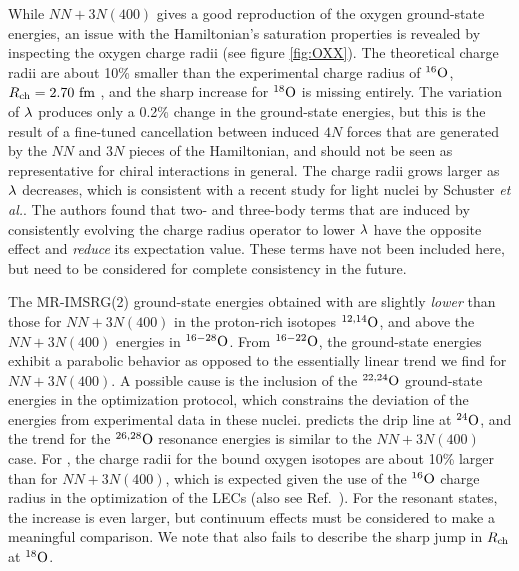 {While $NN+3N(400)$ gives a good reproduction of the oxygen ground-state
energies, an issue with the Hamiltonian's saturation properties is revealed
by inspecting the oxygen charge radii (see figure \ref{fig:OXX}). 
The theoretical charge radii are about 10\% smaller
than the experimental charge radius of $\nuc{O}{16}$, $\Rch=2.70\,\fm$ 
\cite{Angeli:2013rz}, and the sharp increase for $\nuc{O}{18}$ is missing 
entirely. The variation of $\lambdaSRG$ produces only a 0.2\%
change in the ground-state energies, but this is the result of
a fine-tuned cancellation between induced $4N$ forces that are
generated by the $NN$ and $3N$ pieces of the Hamiltonian, and
should not be seen as representative for chiral interactions in
general. The charge radii grows larger as $\lambdaSRG$ decreases,
which is consistent with a recent study for light nuclei 
by Schuster \emph{et al.}\cite{Schuster:2014oq}. The authors found 
that two- and three-body terms that are induced by consistently evolving
the charge radius operator to lower $\lambdaSRG$ have the opposite
effect and \emph{reduce} its expectation value. These terms have not 
been included here, but need to be considered for complete consistency
in the future.

The MR-IMSRG(2) ground-state energies obtained with \NNLOsat{} are 
slightly \emph{lower} than those for $NN\!+\!3N(400)$ in the proton-rich
isotopes $\nuc{O}{12,14}$, and above the $NN\!+\!3N(400)$ energies in 
$\nuc{O}{16-28}$. From $\nuc{O}{16-22}$, the \NNLOsat{} ground-state energies
exhibit a parabolic behavior as opposed to the essentially linear trend
we find for $NN\!+\!3N(400)$. A possible cause is the inclusion of the $\nuc{O}{22,24}$
ground-state energies in the optimization protocol, which constrains
the deviation of the energies from experimental data in these nuclei. 
\NNLOsat{} predicts the drip line at $\nuc{O}{24}$, and the trend for 
the $\nuc{O}{26,28}$ resonance energies is similar to the $NN\!+\!3N(400)$ 
case. For \NNLOsat{}, the charge radii for the bound oxygen isotopes are 
about 10\% larger than for $NN\!+\!3N(400)$, which is expected given 
the use of the $\nuc{O}{16}$ charge radius in the optimization of 
the LECs (also see Ref.~\cite{Lapoux:2016xu}). For the resonant states, 
the increase is even larger, but continuum effects must be considered to 
make a meaningful comparison. We note that \NNLOsat{} also fails to describe 
the sharp jump in $\Rch$ at $\nuc{O}{18}$.


}

